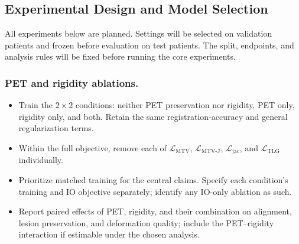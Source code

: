 \begin{journaladdition}
\subsection{Experimental Design and Model Selection}
\label{sec:experiments}
\label{sec:model_selection}
All experiments below are planned. Settings will be selected on validation patients and frozen before evaluation on test patients.
The split, endpoints, and analysis rules will be fixed before running the core experiments.

\subsubsection{PET and rigidity ablations.}
\begin{itemize}
  \item Train the $2\times2$ conditions: neither PET preservation nor rigidity, PET only, rigidity only, and both. Retain the same registration-accuracy and general regularization terms.
  \item Within the full objective, remove each of $\mathcal{L}_{\mathrm{MTV}}$, $\mathcal{L}_{\mathrm{MTV\text{-}J}}$, $\mathcal{L}_{\mathrm{jac}}$, and $\mathcal{L}_{\mathrm{TLG}}$ individually.
  \item Prioritize matched training for the central claims. Specify each condition's training and IO objective separately; identify any IO-only ablation as such.
  \item Report paired effects of PET, rigidity, and their combination on alignment, lesion preservation, and deformation quality; include the PET--rigidity interaction if estimable under the chosen analysis.
\end{itemize}


\end{journaladdition}
